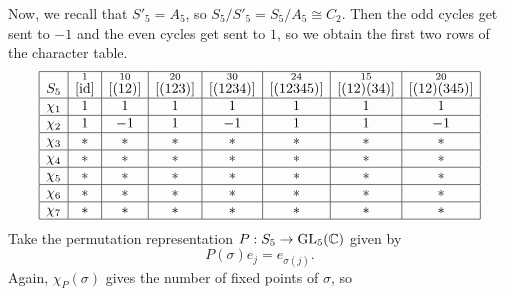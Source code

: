 \begin{exmp}{}
    \newpage
    Now, we recall that $S'_5 = A_5$, so $S_5/S'_5 = S_5/A_5 \cong C_2$. 
    Then the odd cycles get sent to $-1$ and the even cycles get sent to 
    $1$, so we obtain the first two rows of the character table. 
    \begin{align*}
        \begin{array}{|c|c|c|c|c|c|c|c|}
            \hline
            S_5    & \overset{1}{[\operatorname{id}]} & \overset{10}{[(12)]} & \overset{20}{[(123)]} & \overset{30}{[(1234)]} & \overset{24}{[(12345)]} & \overset{15}{[(12)(34)]} & \overset{20}{[(12)(345)]} \\ \hline
            \chi_1 & 1                  & 1                    & 1                     & 1                      & 1                       & 1                        & 1                         \\ \hline
            \chi_2 & 1                  & -1                   & 1                     & -1                     & 1                       & 1                        & -1                        \\ \hline
            \chi_3 & *                  & *                    & *                     & *                      & *                       & *                        & *                         \\ \hline
            \chi_4 & *                  & *                    & *                     & *                      & *                       & *                        & *                         \\ \hline
            \chi_5 & *                  & *                    & *                     & *                      & *                       & *                        & *                         \\ \hline
            \chi_6 & *                  & *                    & *                     & *                      & *                       & *                        & *                         \\ \hline
            \chi_7 & *                  & *                    & *                     & *                      & *                       & *                        & *                         \\ \hline 
        \end{array} 
    \end{align*}
    Take the permutation representation $P : S_5 \to \operatorname{GL}_5(\mathbb{C})$ given by 
    \[ P(\sigma)e_j = e_{\sigma(j)}. \] 
    Again, $\chi_P(\sigma)$ gives the number of fixed points of $\sigma$, so 

\end{exmp}
